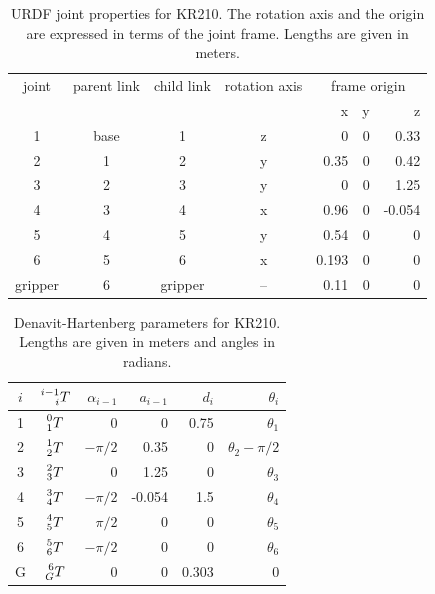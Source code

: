 \documentclass[11pt, onecolumn, oneside, reqno]{article}
\begin{document}
{\renewcommand{\arraystretch}{2}%
\begin{table}
\begin{tabular}{|c|c|c|c|r|r|r|}
\hline 
joint   & parent link & child link & rotation axis & \multicolumn{3}{c|}{frame origin} \\ 
        &             &            &               &     x & y &      z \\
\hline 
1       &        base &          1 &             z &     0 & 0 &   0.33 \\
\hline 
2       &           1 &          2 &             y &  0.35 & 0 &   0.42 \\ 
\hline 
3       &           2 &          3 &             y &     0 & 0 &   1.25 \\ 
\hline 
4       &           3 &          4 &             x &  0.96 & 0 & -0.054 \\ 
\hline 
5       &           4 &          5 &             y &  0.54 & 0 &      0 \\ 
\hline 
6       &           5 &          6 &             x & 0.193 & 0 &      0 \\ 
\hline 
gripper &           6 &    gripper &            -- &  0.11 & 0 &      0 \\ 
\hline 
\end{tabular} 
\caption{URDF joint properties for KR210. The rotation axis and the origin are expressed in terms of the joint frame.  Lengths are given in meters.}
\label{tbl:urdf_params}
\end{table}

{\renewcommand{\arraystretch}{2}%
\begin{table}
\begin{tabular}{|c|c|r|r|r|r|}
\hline 
$i$ & $\prescript{i-1}{i} T$ & $\alpha_{i-1}$ & $a_{i-1}$ & $d_i$ & $\theta_i$ \\ 
\hline
1 & $\prescript{0}{1} T$ &           0 &      0 &  0.75 & $\theta_1$ \\
2 & $\prescript{1}{2} T$ & $- \pi / 2$ &   0.35 &     0 & $\theta_2 - \pi / 2$ \\ 
3 & $\prescript{2}{3} T$ &           0 &   1.25 &     0 & $\theta_3$ \\ 
4 & $\prescript{3}{4} T$ & $- \pi / 2$ & -0.054 &   1.5 & $\theta_4$ \\ 
5 & $\prescript{4}{5} T$ &   $\pi / 2$ &      0 &     0 & $\theta_5$ \\ 
6 & $\prescript{5}{6} T$ & $- \pi / 2$ &      0 &     0 & $\theta_6$ \\
G & $\prescript{6}{G} T$ &           0 &      0 & 0.303 & 0  \\
\hline
\end{tabular}
\caption{Denavit-Hartenberg parameters for KR210. Lengths are given in meters and angles in radians.}
\label{tbl:dh_params}
\end{table}

}}
\end{document}
